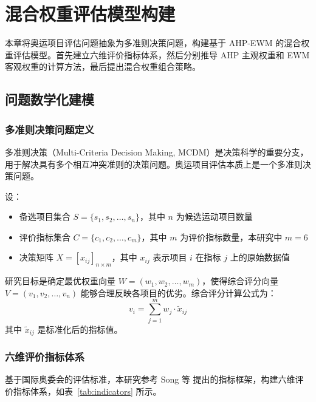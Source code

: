 
\section{混合权重评估模型构建}
\label{sec:model}

本章将奥运项目评估问题抽象为多准则决策问题，构建基于 AHP-EWM 的混合权重评估模型。首先建立六维评价指标体系，然后分别推导 AHP 主观权重和 EWM 客观权重的计算方法，最后提出混合权重组合策略。

\subsection{问题数学化建模}
\label{subsec:problem}

\subsubsection{多准则决策问题定义}

多准则决策（Multi-Criteria Decision Making, MCDM）是决策科学的重要分支，用于解决具有多个相互冲突准则的决策问题\cite{zeleny1982multiple}。奥运项目评估本质上是一个多准则决策问题。

设：
\begin{itemize}
    \item 备选项目集合 $S = \{s_1, s_2, \ldots, s_n\}$，其中 $n$ 为候选运动项目数量
    \item 评价指标集合 $C = \{c_1, c_2, \ldots, c_m\}$，其中 $m$ 为评价指标数量，本研究中 $m = 6$
    \item 决策矩阵 $X = [x_{ij}]_{n \times m}$，其中 $x_{ij}$ 表示项目 $i$ 在指标 $j$ 上的原始数据值
\end{itemize}

研究目标是确定最优权重向量 $W = (w_1, w_2, \ldots, w_m)$，使得综合评分向量 $V = (v_1, v_2, \ldots, v_n)$ 能够合理反映各项目的优劣。综合评分计算公式为：
\begin{equation}
    v_i = \sum_{j=1}^{m} w_j \cdot \tilde{x}_{ij}
    \label{eq:score}
\end{equation}
其中 $\tilde{x}_{ij}$ 是标准化后的指标值。

\subsubsection{六维评价指标体系}

基于国际奥委会的评估标准，本研究参考 Song 等\cite{song2025quantifying} 提出的指标框架，构建六维评价指标体系，如表~\ref{tab:indicators} 所示。

